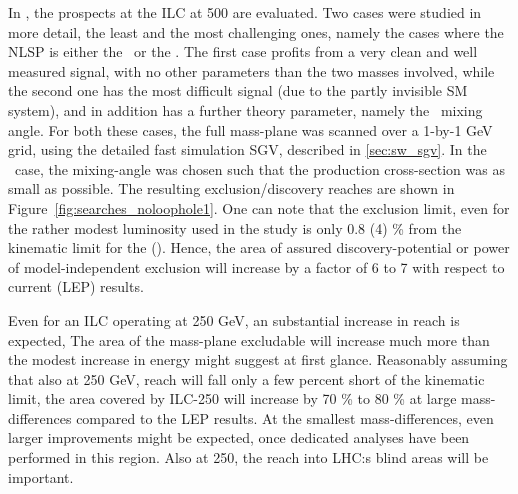 In \cite{Berggren:2013vna},
the prospects at the ILC at 500 are evaluated.
Two cases were studied in more detail, 
the least and the most challenging ones, 
namely the cases where the NLSP is either the \smur~or the \stone.
The first case profits from a very clean and well measured
signal,
with no other parameters than the two masses involved,
while the second one has the most difficult signal 
(due to the partly invisible SM system),
and in addition has a further theory parameter,
namely the \stau~mixing angle.
For both these cases,
the full mass-plane was scanned over a 1-by-1 GeV grid,
using the detailed fast simulation SGV, described in  \ref{sec:sw_sgv}.
In the \stone~case, the mixing-angle was chosen such that the
production cross-section was as small as possible.
The resulting exclusion/discovery reaches are shown in
Figure~\ref{fig:searches_noloophole1}.
One can note that the exclusion limit,
even for the rather modest luminosity used in the study
is only 0.8 (4) \% from the kinematic limit for the \smur (\stone).
Hence, the area of assured discovery-potential or power of
model-independent exclusion
will increase by a factor of 6 to 7 with respect to current (LEP) results.

Even for an ILC operating at 250 GeV, 
an substantial increase in reach is expected,
The area of the mass-plane excludable will increase
much more than the modest increase in energy might suggest at first glance.
Reasonably assuming that also at 250 GeV, 
reach will fall only a few percent short of the kinematic limit,
the area covered by ILC-250 will increase
by 70 \% to 80 \% at large mass-differences compared to the LEP results.
At the smallest mass-differences,
even larger improvements might be expected,
once dedicated analyses have been performed in this region.
Also at 250,
the reach into LHC:s blind areas will be important.
